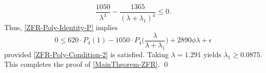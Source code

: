 \documentclass[12pt,psamsfonts]{amsart}
\theoremstyle{definition}
\theoremstyle{remark}
\numberwithin{equation}{section}
\begin{document}
\begin{equation}
\frac{1050}{\lambda^4} -  \frac{1365}{(\lambda+\lambda_1)^4} \leq 0.
\label{ZFR-Poly-Condition-2} 
\end{equation}
Thus, \eqref{ZFR-Poly-Identity-P}  implies
\[
0 \leq 620 \cdot P_4(1)  - 1050 \cdot P_4\big( \frac{\lambda}{\lambda+\lambda_1} \big) + 2890\phi \lambda + \epsilon
\]
provided \eqref{ZFR-Poly-Condition-2} is satisfied. Taking $\lambda = 1.291$ yields $\lambda_1 \geq 0.0875$. This completes the proof of \cref{MainTheorem-ZFR}. \hfill \qed
 
 
 

 
\end{document}
